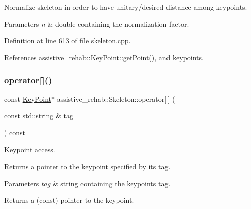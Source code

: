 Normalize skeleton in order to have unitary/desired distance among keypoints. 


\begin{DoxyParams}{Parameters}
{\em n} & double containing the normalization factor. \\
\hline
\end{DoxyParams}


Definition at line 613 of file skeleton.\+cpp.


\begin{DoxyCode}{0}

\end{DoxyCode}


References assistive\+\_\+rehab\+::\+Key\+Point\+::get\+Point(), and keypoints.

\mbox{\label{classassistive__rehab_1_1Skeleton_a3ecc7418af653c88e40d41bb379b7271}} 
\subsubsection{\texorpdfstring{operator[]()}{operator[]()}\hspace{0.1cm}{\footnotesize\ttfamily [1/2]}}
{\footnotesize\ttfamily const \mbox{\hyperlink{classassistive__rehab_1_1KeyPoint}{Key\+Point}}$\ast$ assistive\+\_\+rehab\+::\+Skeleton\+::operator\mbox{[}$\,$\mbox{]} (\begin{DoxyParamCaption}\item[{const std\+::string \&}]{tag }\end{DoxyParamCaption}) const}



Keypoint access. 

Returns a pointer to the keypoint specified by its tag. 
\begin{DoxyParams}{Parameters}
{\em tag} & string containing the keypoint\textquotesingle{}s tag. \\
\hline
\end{DoxyParams}
\begin{DoxyReturn}{Returns}
a (const) pointer to the keypoint. 
\end{DoxyReturn}
\mbox{\label{classassistive__rehab_1_1Skeleton_a0692ab89f16b0914b9ca9e0d4a07e52c}} 
